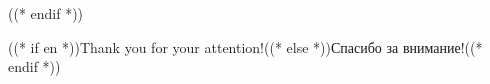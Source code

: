 \documentclass[aspectratio=169, 14pt]{beamer}
\begin{document}
((* endif *))
\begin{frame}[c]
  \begin{center}
    {\LARGE\color{hseblue}((* if en *))Thank you for your attention!((* else *))Спасибо за внимание!((* endif *))}\\[0.9cm]
    {\normalsize\bfseries\hseAuthorName}\\[0.25cm]
    {\small\color{hseblue}\hseProjectName}%
    \ifhseHasAuthorEmail\\[0.25cm]
      {\small\ttfamily\hseAuthorEmail}\fi
  \end{center}
\end{frame}
\end{document}
